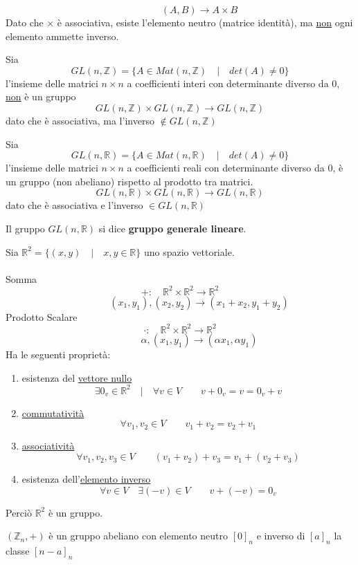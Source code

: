 \documentclass[a4paper,12pt, oneside]{book}
\begin{document}
\begin{shaded}
\begin{esempio}
		$$ \qquad \qquad (A,B) \rightarrow A \times B$$
		Dato che $\times$ è associativa, esiste l'elemento neutro (matrice identità), ma \underline{non} ogni elemento ammette inverso.
	\end{esempio}
	\begin{esempio}
		Sia $$GL(n, \mathbb{Z}) = \{ A \in Mat(n, \mathbb{Z}) \quad | \quad det(A) \not = 0 \}$$ l'insieme delle matrici $n \times n$ a coefficienti interi con determinante diverso da $0$, \underline{non} è un gruppo
		$$GL(n, \mathbb{Z}) \times GL(n, \mathbb{Z}) \rightarrow GL(n, \mathbb{Z})$$
		dato che è associativa, ma l'inverso $\not\in GL(n, \mathbb{Z})$
	\end{esempio}
	\begin{esempio}
		Sia $$GL(n, \mathbb{R}) = \{ A \in Mat(n, \mathbb{R}) \quad | \quad det(A) \not = 0 \}$$ l'insieme delle matrici $n \times n$ a coefficienti reali con determinante diverso da $0$, è un gruppo (non abeliano) rispetto al prodotto tra matrici.
		$$GL(n, \mathbb{R}) \times GL(n, \mathbb{R}) \rightarrow GL(n, \mathbb{R})$$
		dato che è associativa e l'inverso $\in GL(n, \mathbb{R})$
		\begin{nota}
			Il gruppo $GL(n, \mathbb{R})$ si dice \textbf{gruppo generale lineare}.
		\end{nota}
	\end{esempio}
	\begin{esempio}
		Sia $\mathbb{R}^2 = \{ (x,y) \quad | \quad x,y \in \mathbb{R} \}$ uno spazio vettoriale.\\\\
		Somma
		$$+: \quad \mathbb{R}^2 \times \mathbb{R}^2 \rightarrow \mathbb{R}^2$$
		$$ \qquad \qquad (x_1,y_1), (x_2,y_2) \rightarrow (x_1+x_2, y_1+y_2)$$
		Prodotto Scalare
		$$\cdot: \quad \mathbb{R}^2 \times \mathbb{R}^2 \rightarrow \mathbb{R}^2$$
		$$ \qquad \qquad \alpha, (x_1,y_1) \rightarrow (\alpha x_1, \alpha y_1)$$
		Ha le seguenti proprietà:
		\begin{enumerate}
			\item esistenza del \underline{vettore nullo} $$\exists 0_v \in \mathbb{R}^2 \quad | \quad \forall v \in V \qquad v+0_v = v = 0_v+v$$
			\item \underline{commutatività} $$\forall v_1,v_2 \in V \qquad v_1+v_2=v_2+v_1$$
			\item \underline{associatività} $$\forall v_1,v_2,v_3 \in V \qquad (v_1+v_2)+v_3=v_1+(v_2+v_3)$$
			\item esistenza dell'\underline{elemento inverso} $$\forall v \in V \quad \exists (-v) \in V \qquad v+(-v) = 0_v$$
		\end{enumerate}
		Perciò $\mathbb{R}^2$ è un gruppo.
	\end{esempio}
	\begin{esempio}
		$(\mathbb{Z}_n, +)$ è un gruppo abeliano con elemento neutro $[0]_n$ e inverso di $[a]_n$ la classe $[n-a]_n$
	\end{esempio}
\end{shaded}
\end{document}
